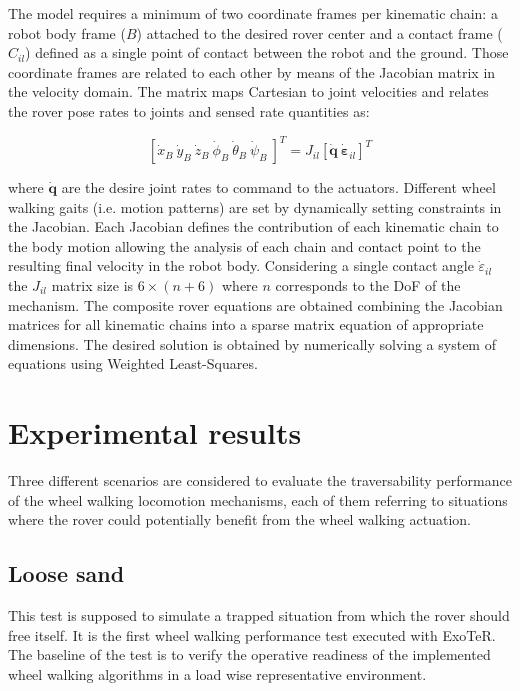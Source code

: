 \documentclass[a4paper,twocolumn]{esapub2005} %
\begin{document}
The model requires a minimum of two coordinate frames per kinematic chain:
a robot body frame ($B$) attached to the desired rover center and a
contact frame ($C_{il}$) defined as a single point of contact between the robot
and the ground. Those coordinate frames are related to each other by means of
the Jacobian matrix in the velocity domain. The matrix maps Cartesian to joint velocities and
relates the rover pose rates to joints and sensed rate quantities as:

\begin{equation}
    \left[\dot{x}_{B} ~ \dot{y}_{B} ~ \dot{z}_{B} ~ \dot{\phi}_{B} ~ \dot{\theta}_{B} ~ \dot{\psi}_{B} ~ \right]^T =
    J_{il} \left[\boldsymbol{\dot{q}} ~ \boldsymbol{\dot{\varepsilon}}_{il} \right]^T
\label{eq:wheeljacobian}
\end{equation}

where $\boldsymbol{\dot{q}}$ are the desire joint rates to command to the
actuators.  Different wheel walking gaits (i.e. motion patterns) are set by dynamically setting
constraints in the Jacobian. Each Jacobian defines the contribution of each
kinematic chain to the body motion allowing the analysis of each chain and
contact point to the resulting final velocity in the robot body.  Considering a
single contact angle $\dot{\varepsilon}_{il}$ the $J_{il}$ matrix size is $6
\times (n + 6)$ where $n$ corresponds to the DoF of the mechanism.  The
composite rover equations are obtained combining the Jacobian matrices for all
kinematic chains into a sparse matrix equation of appropriate dimensions. The
desired solution is obtained by numerically solving a system of equations using
Weighted Least-Squares.



\section{Experimental results}

Three different scenarios are considered to evaluate the traversability performance of the wheel walking locomotion mechanisms, each of them referring to situations where the rover could potentially benefit from the wheel walking actuation.

\subsection{Loose sand}
This test is supposed to simulate a trapped situation from which the rover should free itself. It is the first wheel walking performance test executed with ExoTeR. The baseline of the test is to verify the operative readiness of the implemented wheel walking algorithms in a load wise representative environment.
\end{document}
